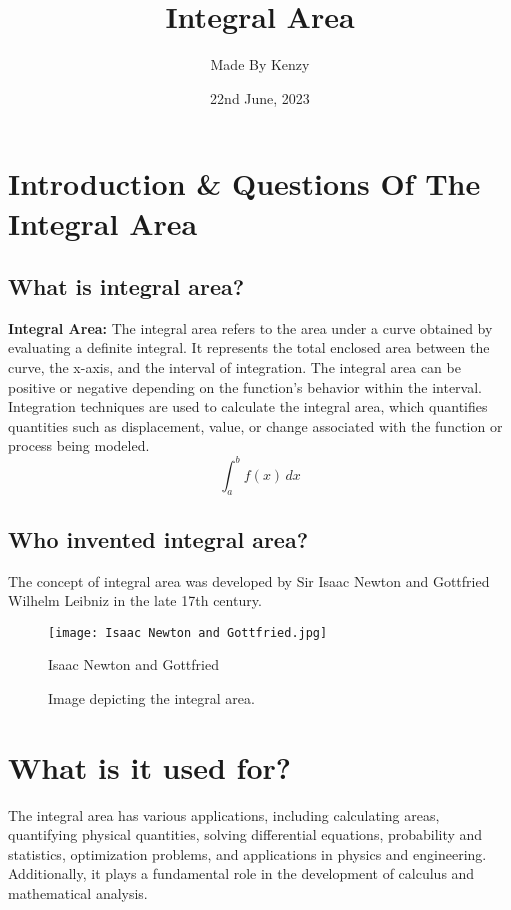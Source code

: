 \documentclass{article}
\begin{document}
\title{Integral Area}
\author{Made By Kenzy}
\date{22nd June, 2023}

\maketitle
\section{Introduction \& Questions Of The Integral Area}
\nopagecolor 
\subsection{What is integral area?}
\textbf{Integral Area:}
The integral area refers to the area under a curve obtained by evaluating a definite integral. It represents the total enclosed area between the curve, the x-axis, and the interval of integration. The integral area can be positive or negative depending on the function's behavior within the interval. Integration techniques are used to calculate the integral area, which quantifies quantities such as displacement, value, or change associated with the function or process being modeled.
\begin{equation}
    \int_a^b f(x) \, dx
\end{equation}
\subsection{Who invented integral area?}
The concept of integral area was developed by Sir Isaac Newton and Gottfried Wilhelm Leibniz in the late 17th century.
\begin{figure}[ht]
    \centering
    \texttt{[image: Isaac Newton and Gottfried.jpg]}
    \caption{Image depicting the integral area.}
    \label{fig:integral_area}
    \vspace{10pt}
    \small Isaac Newton and Gottfried
\end{figure}
\section{What is it used for?}
The integral area has various applications, including calculating areas, quantifying physical quantities, solving differential equations, probability and statistics, optimization problems, and applications in physics and engineering. Additionally, it plays a fundamental role in the development of calculus and mathematical analysis.
\end{document}

